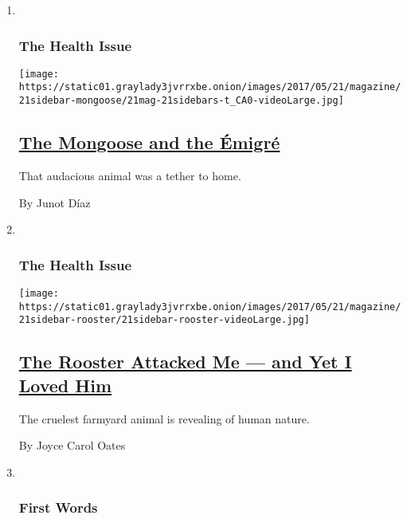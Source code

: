 \begin{enumerate}
\def\labelenumi{\arabic{enumi}.}
\item ~
  \hypertarget{the-health-issue-9}{%
  \subsubsection{The Health Issue}\label{the-health-issue-9}}

  \texttt{[image: https://static01.graylady3jvrrxbe.onion/images/2017/05/21/magazine/21sidebar-mongoose/21mag-21sidebars-t\_CA0-videoLarge.jpg]}

  \hypertarget{the-mongoose-and-the-uxe9migruxe9}{%
  \subsection{\texorpdfstring{\href{/2017/05/17/magazine/the-mongoose-and-the-emigre.html}{The
  Mongoose and the
  Émigré}}{The Mongoose and the Émigré}}\label{the-mongoose-and-the-uxe9migruxe9}}

  That audacious animal was a tether to home.

  By Junot Díaz
\item ~
  \hypertarget{the-health-issue-10}{%
  \subsubsection{The Health Issue}\label{the-health-issue-10}}

  \texttt{[image: https://static01.graylady3jvrrxbe.onion/images/2017/05/21/magazine/21sidebar-rooster/21sidebar-rooster-videoLarge.jpg]}

  \hypertarget{the-rooster-attacked-me--and-yet-i-loved-him}{%
  \subsection{\texorpdfstring{\href{/2017/05/17/magazine/the-rooster-attacked-me-and-yet-i-loved-him.html}{The
  Rooster Attacked Me --- and Yet I Loved
  Him}}{The Rooster Attacked Me --- and Yet I Loved Him}}\label{the-rooster-attacked-me--and-yet-i-loved-him}}

  The cruelest farmyard animal is revealing of human nature.

  By Joyce Carol Oates
\item ~
  \hypertarget{first-words}{%
  \subsubsection{First Words}\label{first-words}}


\end{enumerate}
